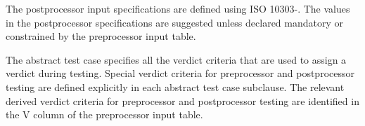     The postprocessor input specifications are defined using
ISO 10303-\theAPpartno. The values in the postprocessor specifications
are suggested unless declared mandatory or constrained by the
preprocessor input table.

    The abstract test case specifies all the verdict criteria that are
used to assign a verdict during testing. Special verdict criteria for
preprocessor and postprocessor testing are defined explicitly in each
abstract test case subclause. The relevant derived verdict criteria
for preprocessor and postprocessor testing are identified in the V
column of the preprocessor input table.

\endinput
